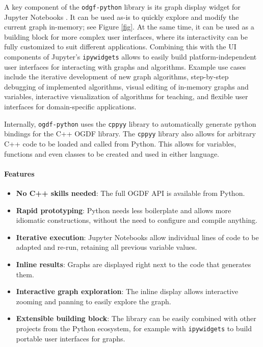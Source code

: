\documentclass{llncs}
\begin{document}
A key component of the \texttt{odgf-python} library is its graph display widget for Jupyter Notebooks \cite{str-agw-22}.
It can be used as-is to quickly explore and modify the current graph in-memory; see Figure \ref{fig}.
At the same time, it can be used as a building block for more complex user interfaces, where its interactivity can be fully customized to suit different applications.
Combining this with the UI components of Jupyter's \texttt{ipywidgets} allows to easily build platform-independent user interfaces for interacting with graphs and algorithms.
Example use cases include the iterative development of new graph algorithms,
step-by-step debugging of implemented algorithms,
visual editing of in-memory graphs and variables,
interactive visualization of algorithms for teaching, and 
flexible user interfaces for domain-specific applications.

Internally, \texttt{ogdf-python} uses the \texttt{cppyy} library \cite{ld-hpp-16,kvl-eaa-23} to automatically generate python bindings for the C++ OGDF library.
The \texttt{cppyy} library also allows for arbitrary C++ code to be loaded and called from Python.
This allows for variables, functions and even classes to be created and used in either language.

\paragraph{Features}
\begin{itemize}
\item \textbf{No C++ skills needed}: The full OGDF API is available from Python.
\item \textbf{Rapid prototyping}: Python needs less boilerplate and allows more idiomatic constructions, 
  without the need to configure and compile anything.
\item \textbf{Iterative execution}: Jupyter Notebooks allow individual lines of code to be adapted and re-run,
  retaining all previous variable values.
\item \textbf{Inline results}: Graphs are displayed right next to the code that generates them.
\item \textbf{Interactive graph exploration}: The inline display allows interactive zooming and panning to easily explore the graph.
\item \textbf{Extensible building block}: The library can be easily combined with other projects from the Python ecosystem, for example with \texttt{ipywidgets} to build portable user interfaces for graphs.
\end{itemize}
\end{document}
